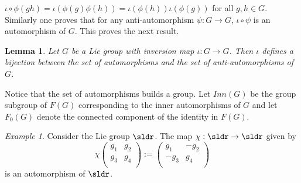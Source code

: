 \documentclass[11pt]{amsart}
\theoremstyle{plain}
\newtheorem{lem}[thm]{Lemma}
\theoremstyle{definition}
\theoremstyle{remark}
\newtheorem{exa}[thm]{Example}
\begin{document}
$\iota \circ \phi(gh)=\iota(\phi(g) \phi(h))=\iota(\phi(h)) \iota(\phi(g))$ for all $g, h\in G$.  Similarly one proves that for any anti-automorphism $\psi:G \to G$, $\iota \circ \psi$ is an automorphism of $G$. This proves the next result.



\begin{lem} \label{anti}
Let $G$ be a Lie group with inversion map $\iota: G \rightarrow G$. Then $\iota$ defines a bijection between the set of automorphisms and the set of anti-automorphisms of $G$. 
\end{lem}

Notice that the set of automorphisms builds a group. Let $Inn(G)$ be the group subgroup of $F(G)$ corresponding to the inner automorphisms of $G$ and let $F_0(G)$ denote the connected component of the identity in $F(G)$. 


\begin{exa}\label{chi} Consider the Lie group  $\sldr$. The map $\chi: \sldr \to \sldr$ given by 
\[\chi  \begin{pmatrix}
   g_1 & g_2 \\
   g_3 & g_4 \\
  \end{pmatrix} :=  \begin{pmatrix}
   g_1 & -g_2 \\
   -g_3 & g_4 \\
  \end{pmatrix} 
\]
is an automorphism of $\sldr$. 
\end{exa}
\end{document}
